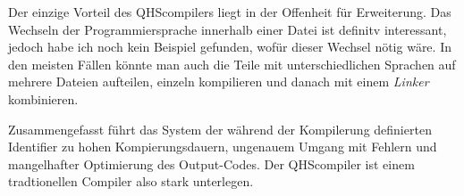 Der einzige Vorteil des QHScompilers liegt in der Offenheit für Erweiterung.
Das Wechseln der Programmiersprache innerhalb einer Datei ist definitv interessant, jedoch habe ich noch kein Beispiel gefunden, wofür dieser Wechsel nötig wäre.
In den meisten Fällen könnte man auch die Teile mit unterschiedlichen Sprachen auf mehrere Dateien aufteilen, einzeln kompilieren und danach mit einem \textit{Linker} kombinieren.

Zusammengefasst führt das System der während der Kompilerung definierten Identifier zu hohen Kompierungsdauern, ungenauem Umgang mit Fehlern und mangelhafter Optimierung des Output-Codes.
Der QHScompiler ist einem tradtionellen Compiler also stark unterlegen.
